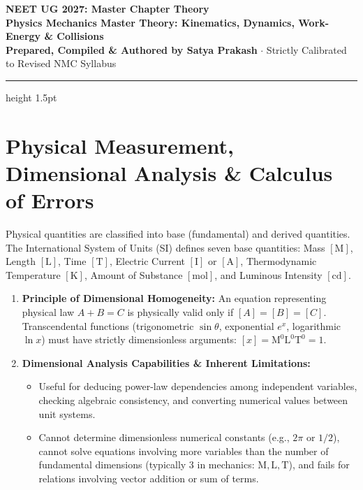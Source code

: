 \documentclass[10pt,a4paper]{article}
\begin{document}
\begin{center}
  {\Huge \textbf{NEET UG 2027: Master Chapter Theory}}\\[6pt]
  {\Large \textbf{Physics Mechanics Master Theory: Kinematics, Dynamics, Work-Energy \& Collisions}}\\[4pt]
  {\small \textbf{Prepared, Compiled \& Authored by Satya Prakash} $\cdot$ Strictly Calibrated to Revised NMC Syllabus}
  \vspace{4pt}
  \hrule height 1.5pt
\end{center}

\section{Physical Measurement, Dimensional Analysis \& Calculus of Errors}

\begin{conceptbox}
Physical quantities are classified into base (fundamental) and derived quantities. The International System of Units (SI) defines seven base quantities: Mass $[\mathrm{M}]$, Length $[\mathrm{L}]$, Time $[\mathrm{T}]$, Electric Current $[\mathrm{I}]$ or $[\mathrm{A}]$, Thermodynamic Temperature $[\mathrm{K}]$, Amount of Substance $[\mathrm{mol}]$, and Luminous Intensity $[\mathrm{cd}]$.
\begin{enumerate}[leftmargin=*]
  \item \textbf{Principle of Dimensional Homogeneity:} An equation representing physical law $A + B = C$ is physically valid only if $[A] = [B] = [C]$. Transcendental functions (trigonometric $\sin\theta$, exponential $e^x$, logarithmic $\ln x$) must have strictly dimensionless arguments: $[x] = \mathrm{M}^0\mathrm{L}^0\mathrm{T}^0 = 1$.
  \item \textbf{Dimensional Analysis Capabilities \& Inherent Limitations:}
  \begin{itemize}
    \item Useful for deducing power-law dependencies among independent variables, checking algebraic consistency, and converting numerical values between unit systems.
    \item Cannot determine dimensionless numerical constants (e.g., $2\pi$ or $1/2$), cannot solve equations involving more variables than the number of fundamental dimensions (typically 3 in mechanics: $\mathrm{M, L, T}$), and fails for relations involving vector addition or sum of terms.
  \end{itemize}
\end{enumerate}
\end{conceptbox}
\end{document}
